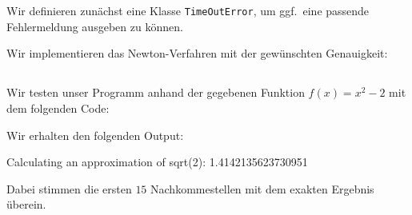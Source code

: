 \section{}





\subsection{}

Wir definieren zunächst eine Klasse \texttt{TimeOutError}, um ggf.\ eine passende Fehlermeldung ausgeben zu können.



Wir implementieren das Newton-Verfahren mit der gewünschten Genauigkeit:







\subsection{}

Wir testen unser Programm anhand der gegebenen Funktion $f(x) = x^2 - 2$ mit dem folgenden Code:



Wir erhalten den folgenden Output:

\begin{consoleoutput}
Calculating an approximation of sqrt(2):
1.4142135623730951
\end{consoleoutput}

Dabei stimmen die ersten $15$ Nachkommestellen mit dem exakten Ergebnis überein.
